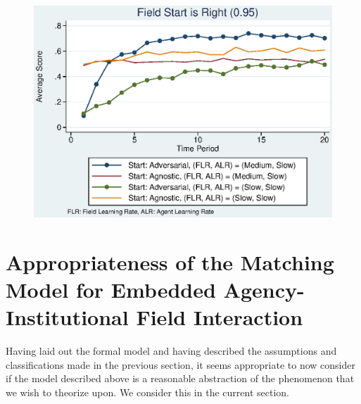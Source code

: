 \documentclass[12pt,letterpaper]{article}
\begin{document}
\begin{figure}[h]
\begin{centering}
  \includegraphics[width=\textwidth]{frcmedium3b}
  \caption{}
  \label{fig:3b}
\end{centering}
\end{figure}

\section{Appropriateness of the Matching Model for Embedded Agency-Institutional Field Interaction}
\noindent Having laid out the formal model and having described the assumptions and classifications made in the previous section, it seems appropriate to now consider if the model described above is a reasonable abstraction of the phenomenon that we wish to theorize upon. We consider this in the current section.\\\\
\end{document}
